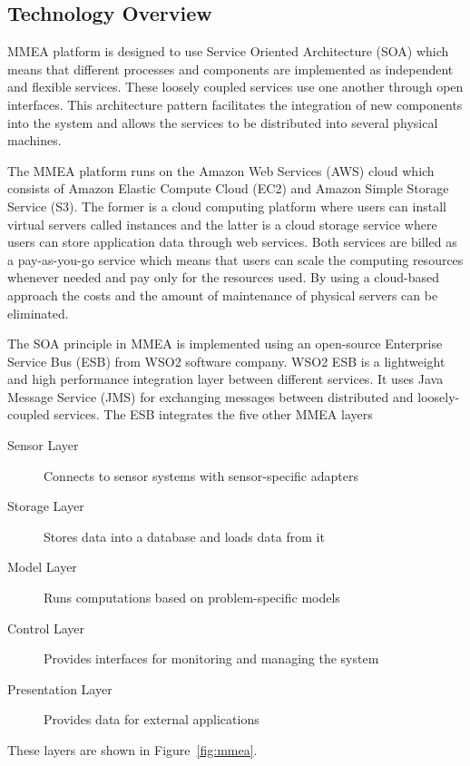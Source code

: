 
\subsection{Technology Overview}
MMEA platform is designed to use Service Oriented Architecture (SOA) which means that different processes and components are implemented as independent and flexible services. These loosely coupled services use one another through open interfaces. This architecture pattern facilitates the integration of new components into the system and allows the services to be distributed into several physical machines. 

The MMEA platform runs on the Amazon Web Services (AWS) cloud which consists of Amazon Elastic Compute Cloud (EC2) and Amazon Simple Storage Service (S3). The former is a cloud computing platform where users can install virtual servers called instances and the latter is a cloud storage service where users can store application data through web services. Both services are billed as a pay-as-you-go service which means that users can scale the computing resources whenever needed and pay only for the resources used. By using a cloud-based approach the costs and the amount of maintenance of physical servers can be eliminated.

The SOA principle in MMEA is implemented using an open-source Enterprise Service Bus (ESB) from WSO2 software company. WSO2 ESB is a lightweight and high performance integration layer between different services. It uses Java Message Service (JMS) for exchanging messages between distributed and loosely-coupled services. The ESB integrates the five other MMEA layers
\begin{description}
\item[Sensor Layer]{Connects to sensor systems with sensor-specific adapters}
\item[Storage Layer]{Stores data into a database and loads data from it}
\item[Model Layer]{Runs computations based on problem-specific models}
\item[Control Layer]{Provides interfaces for monitoring and managing the system}
\item[Presentation Layer]{Provides data for external applications}
\end{description}
These layers are shown in Figure~\ref{fig:mmea}.

